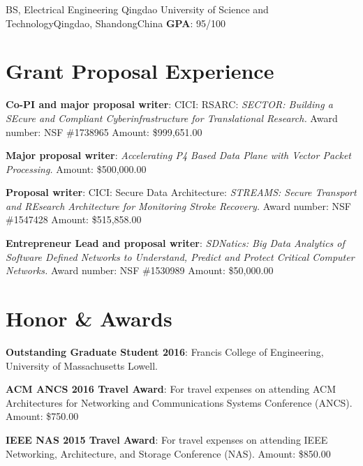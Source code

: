 \documentclass[11pt]{moderncv}
\begin{document}
        {BS, Electrical Engineering}
        {Qingdao University of Science and Technology}{Qingdao, Shandong}{China}
        {\textbf{GPA}: 95/100        
        }

\section{Grant Proposal Experience}
%
{\textbf{Co-PI and major proposal writer}: CICI: RSARC: \textit{SECTOR: Building a {SE}cure and Compliant {C}yberinfrastructure for {T}ranslati{o}nal {R}esearch.} \newline
Award number: NSF \#1738965 \newline
Amount: \$999,651.00
}

%
{\textbf{Major proposal writer}: \textit{Accelerating P4 Based Data Plane with Vector Packet Processing.} \newline
Amount: \$500,000.00
}

%
{\textbf{Proposal writer}: CICI: Secure Data Architecture: \textit{STREAMS: Secure Transport and REsearch Architecture for Monitoring Stroke Recovery.} \newline
Award number: NSF \#1547428 \newline
Amount: \$515,858.00
}

%
{\textbf{Entrepreneur Lead and proposal writer}: \textit{SDNatics: Big Data Analytics of Software Defined Networks to Understand, Predict and Protect Critical Computer Networks.} \newline
Award number: NSF \#1530989 \newline
Amount: \$50,000.00
}

\section{Honor \& Awards}
%
{\textbf{Outstanding Graduate Student 2016}: Francis College of Engineering, University of Massachusetts Lowell.
}

%
{\textbf{ACM ANCS 2016 Travel Award}: For travel expenses on attending ACM Architectures for Networking and Communications Systems Conference (ANCS). \newline
Amount: \$750.00
}

%
{\textbf{IEEE NAS 2015 Travel Award}: For travel expenses on attending IEEE Networking, Architecture, and Storage Conference (NAS). \newline
Amount: \$850.00
}
\end{document}
